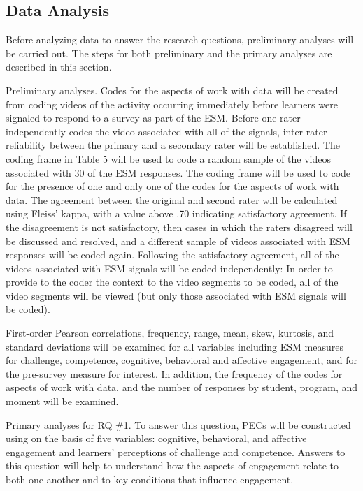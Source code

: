 \documentclass[]{msu-thesis}
\theoremstyle{definition}
\theoremstyle{definition}
\theoremstyle{definition}
\theoremstyle{remark}
\begin{document}
\subsection{Data Analysis}\label{data-analysis}

Before analyzing data to answer the research questions, preliminary
analyses will be carried out. The steps for both preliminary and the
primary analyses are described in this section.

Preliminary analyses. Codes for the aspects of work with data will be
created from coding videos of the activity occurring immediately before
learners were signaled to respond to a survey as part of the ESM. Before
one rater independently codes the video associated with all of the
signals, inter-rater reliability between the primary and a secondary
rater will be established. The coding frame in Table 5 will be used to
code a random sample of the videos associated with 30 of the ESM
responses. The coding frame will be used to code for the presence of one
and only one of the codes for the aspects of work with data. The
agreement between the original and second rater will be calculated using
Fleiss' kappa, with a value above .70 indicating satisfactory agreement.
If the disagreement is not satisfactory, then cases in which the raters
disagreed will be discussed and resolved, and a different sample of
videos associated with ESM responses will be coded again. Following the
satisfactory agreement, all of the videos associated with ESM signals
will be coded independently: In order to provide to the coder the
context to the video segments to be coded, all of the video segments
will be viewed (but only those associated with ESM signals will be
coded).

First-order Pearson correlations, frequency, range, mean, skew,
kurtosis, and standard deviations will be examined for all variables
including ESM measures for challenge, competence, cognitive, behavioral
and affective engagement, and for the pre-survey measure for interest.
In addition, the frequency of the codes for aspects of work with data,
and the number of responses by student, program, and moment will be
examined.

Primary analyses for RQ \#1. To answer this question, PECs will be
constructed using on the basis of five variables: cognitive, behavioral,
and affective engagement and learners' perceptions of challenge and
competence. Answers to this question will help to understand how the
aspects of engagement relate to both one another and to key conditions
that influence engagement.
\end{document}
